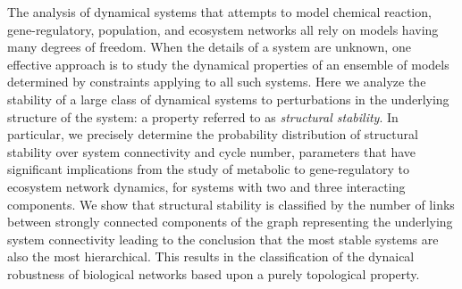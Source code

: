 The analysis of dynamical systems that attempts to model chemical reaction, gene-regulatory, population, and ecosystem networks all rely on models having many degrees of freedom. When the details of a system are unknown, one effective approach is to study the dynamical properties of an ensemble of models determined by constraints applying to all such systems. Here we analyze the stability of a large class of dynamical systems to perturbations in the underlying structure of the system: a property referred to as \emph{structural stability}. In particular, we precisely determine the probability distribution of structural stability over system connectivity and cycle number, parameters that have significant implications from the study of metabolic to gene-regulatory to ecosystem network dynamics, for systems with two and three interacting components. We show that structural stability is classified by the number of links between strongly connected components of the graph representing the underlying system connectivity leading to the conclusion that the most stable systems are also the most hierarchical. This results in the classification of the dynaical robustness of biological networks based upon a purely topological property.
